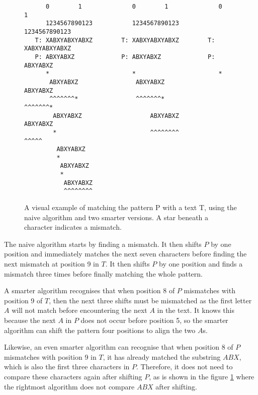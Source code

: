 \begin{figure}[b!]
\begin{verbatim}
      0        1              0        1              0        1   
      1234567890123           1234567890123           1234567890123
   T: XABXYABXYABXZ        T: XABXYABXYABXZ        T: XABXYABXYABXZ
   P: ABXYABXZ             P: ABXYABXZ             P: ABXYABXZ     
      *                       *                       *            
       ABXYABXZ                ABXYABXZ                ABXYABXZ    
       ^^^^^^^*                ^^^^^^^*                ^^^^^^^*    
        ABXYABXZ                   ABXYABXZ                ABXYABXZ
        *                          ^^^^^^^^                   ^^^^^
         ABXYABXZ                                                  
         *                                                         
          ABXYABXZ                                                 
          *                                                        
           ABXYABXZ                                                
           ^^^^^^^^                                                
\end{verbatim}
    \caption{A visual example of matching the pattern P with a text T, using the naive algorithm and two smarter versions. A star beneath a character indicates a mismatch. }
    \label{fig:stringmatchingexample}
\end{figure}

The naive algorithm starts by finding a mismatch. It then shifts $P$ by one position and immediately matches the next seven characters before finding the next mismatch at position 9 in $T$. It then shifts $P$ by one position and finds a mismatch three times before finally matching the whole pattern. 

A smarter algorithm recognises that when position 8 of $P$ mismatches with position 9 of $T$, then the next three shifts must be mismatched as the first letter $A$ will not match before encountering the next $A$ in the text. It knows this because the next $A$ in $P$ does not occur before position 5, so the smarter algorithm can shift the pattern four positions to align the two $A$s. 

Likewise, an even smarter algorithm can recognise that when position 8 of $P$ mismatches with position 9 in $T$, it has already matched the substring $ABX$, which is also the first three characters in $P$. Therefore, it does not need to compare these characters again after shifting $P$, as is shown in the figure \ref{fig:stringmatchingexample} where the rightmost algorithm does not compare $ABX$ after shifting. 

